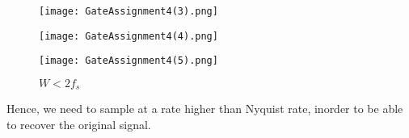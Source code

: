 \documentclass[journal,12pt,twocolumn]{IEEEtran}
\begin{document}
\begin{figure}[!h]
 \centering
 \texttt{[image: GateAssignment4(3).png]}
 \caption{$W>2f_s$}
 \label{plot}
 \texttt{[image: GateAssignment4(4).png]}
 \caption{$W=2f_s$}
 \label{plot}
 \texttt{[image: GateAssignment4(5).png]}
 \caption{$W<2f_s$}
 \label{plot}
\end{figure}

Hence, we need to sample at a rate higher than Nyquist rate, inorder to be able to recover the original signal.
\end{document}
